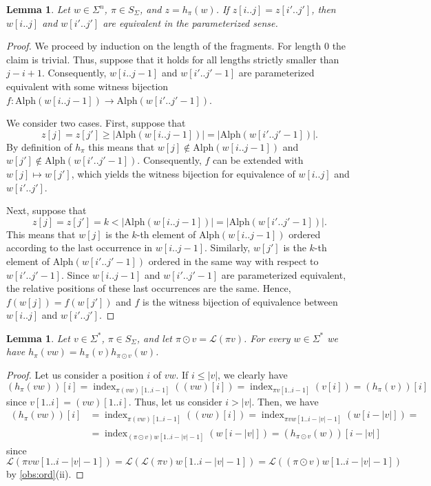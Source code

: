 \documentclass{article}
\theoremstyle{plain}
\newtheorem{lemma}[theorem]{Lemma}
\theoremstyle{definition}
\theoremstyle{remark}
\renewcommand{\Alph}{\mathrm{Alph}}
\renewcommand{\L}{\mathcal{L}}
\DeclareMathOperator{\ind}{index}
\begin{document}
\begin{lemma}\label{lem:eq}
Let $w\in \Sigma^n$, $\pi \in S_\Sigma$, and $z=h_\pi(w)$.
If $z[i..j]=z[i'..j']$, then $w[i..j]$ and $w[i'..j']$ are equivalent in the parameterized sense.
\end{lemma}
\begin{proof}
We proceed by induction on the length of the fragments. For length 0 the claim is trivial.
Thus, suppose that it holds for all lengths strictly smaller than $j-i+1$. 
Consequently, $w[i..j-1]$ and $w[i'..j'-1]$ are parameterized equivalent with some witness bijection $f:\Alph(w[i..j-1])\to \Alph(w[i'..j'-1])$.

We consider two cases. First, suppose that
\[z[j]=z[j']\ge|\Alph(w[i..j-1])|=|\Alph(w[i'..j'-1])|.\]
By definition of $h_{\pi}$ this means that $w[j]\notin \Alph(w[i..j-1])$ and $w[j']\notin \Alph(w[i'..j'-1])$.
Consequently, $f$ can be extended with $w[j]\mapsto w[j']$, which yields the witness bijection for equivalence of $w[i..j]$
and $w[i'..j']$.

Next, suppose that
\[z[j]=z[j'] = k < |\Alph(w[i..j-1])|=|\Alph(w[i'..j'-1])|.\]
This means that $w[j]$ is the $k$-th element of $\Alph(w[i..j-1])$ ordered according to the last occurrence in $w[i..j-1]$.
Similarly, $w[j']$ is the $k$-th element of $\Alph(w[i'..j'-1])$ ordered in the same way with respect to $w[i'..j'-1]$.
Since $w[i..j-1]$ and $w[i'..j'-1]$ are parameterized equivalent, the relative positions of these last occurrences are the same.
Hence, $f(w[j])=f(w[j'])$ and $f$ is the witness bijection of equivalence between $w[i..j]$ and $w[i'..j']$.
\end{proof}

\begin{lemma}\label{lem:comp}
Let $v\in \Sigma^*$, $\pi \in S_{\Sigma}$, and let $\pi \odot v = \L(\pi v)$.
For every $w\in \Sigma^*$ we have $h_{\pi}(vw) = h_\pi(v)h_{\pi \odot v}(w)$.
\end{lemma}
\begin{proof}
Let us consider a position $i$ of $vw$. If $i\le |v|$, we clearly have 
\[(h_{\pi}(vw))[i]=\ind_{\pi (vw)[1..i-1]}((vw)[i])=\ind_{\pi v[1..i-1]}(v[i])=(h_{\pi}(v))[i]\]
since $v[1..i]=(vw)[1..i]$. Thus, let us consider $i > |v|$.
Then, we have
\begin{align*}
  (h_{\pi}(vw))[i] &= \ind_{\pi(vw)[1..i-1]}((vw)[i])=\ind_{\pi vw[1..i-|v|-1]}(w[i-|v|])=\\
                   &= \ind_{(\pi \odot v) w[1..i-|v|-1]}(w[i-|v|]) = (h_{\pi \odot v}(w))[i-|v|]
\end{align*}
since \[\L(\pi vw[1..i-|v|-1])=\L(\L(\pi v)w[1..i-|v|-1])=\L((\pi \odot v) w[1..i-|v|-1])\] by \cref{obs:ord}(ii).
\end{proof}
\end{document}
